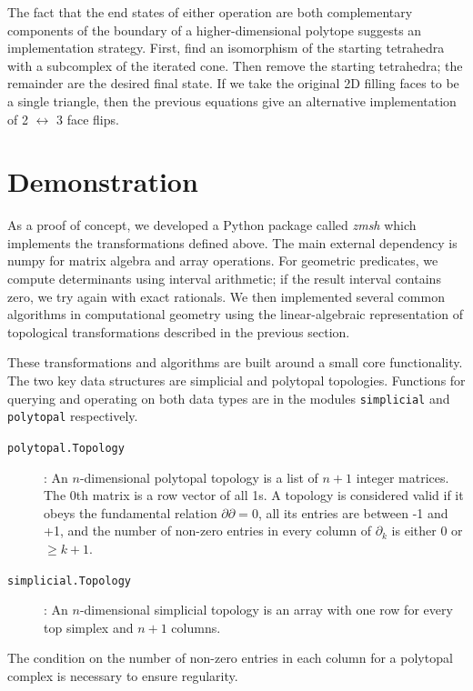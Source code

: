\documentclass[twocolumn,leqno,twocolumn]{article}
\begin{document}
The fact that the end states of either operation are both complementary components of the boundary of a higher-dimensional polytope suggests an implementation strategy.
First, find an isomorphism of the starting tetrahedra with a subcomplex of the iterated cone.
Then remove the starting tetrahedra; the remainder are the desired final state.
If we take the original 2D filling faces to be a single triangle, then the previous equations give an alternative implementation of 2 $\leftrightarrow$ 3 face flips.



\section{Demonstration}

As a proof of concept, we developed a Python package called \emph{zmsh} which implements the transformations defined above.
The main external dependency is numpy for matrix algebra and array operations.
For geometric predicates, we compute determinants using interval arithmetic; if the result interval contains zero, we try again with exact rationals.
We then implemented several common algorithms in computational geometry using the linear-algebraic representation of topological transformations described in the previous section.

These transformations and algorithms are built around a small core functionality.
The two key data structures are simplicial and polytopal topologies.
Functions for querying and operating on both data types are in the modules \texttt{simplicial} and \texttt{polytopal} respectively.
\begin{description}
    \item[\texttt{polytopal.Topology}]: An $n$-dimensional polytopal topology is a list of $n + 1$ integer matrices.
        The 0th matrix is a row vector of all 1s.
        A topology is considered valid if it obeys the fundamental relation $\partial\partial = 0$, all its entries are between -1 and +1, and the number of non-zero entries in every column of $\partial_k$ is either 0 or $\ge k + 1$.
    \item[\texttt{simplicial.Topology}]: An $n$-dimensional simplicial topology is an array with one row for every top simplex and $n + 1$ columns.
\end{description}
The condition on the number of non-zero entries in each column for a polytopal complex is necessary to ensure regularity.
\end{document}
